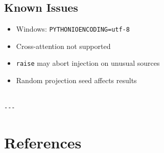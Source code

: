 \subsection{Known Issues}

\begin{itemize}
\item Windows: \texttt{PYTHONIOENCODING=utf-8}
\item Cross-attention not supported
\item \texttt{raise} may abort injection on unusual sources
\item Random projection seed affects results
\end{itemize}
\begin{lstlisting}

---
\end{lstlisting}


\section{References}

